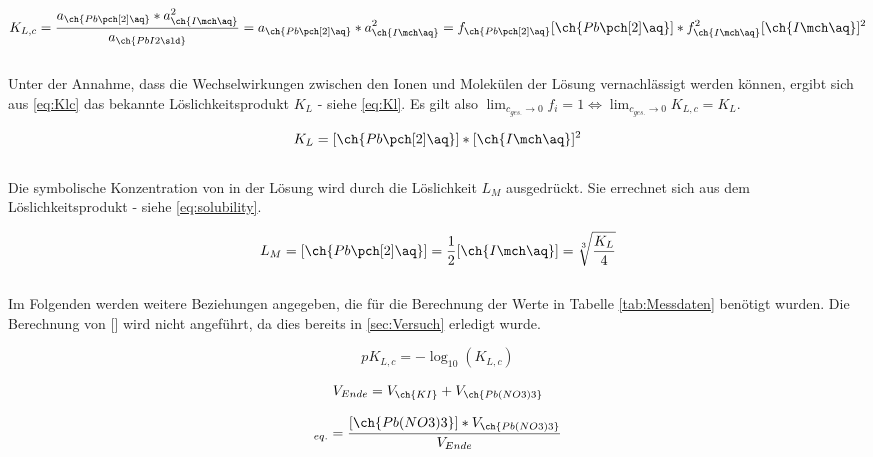 \documentclass{article}
\begin{document}
      \begin{equation}
        K_{L,c} = \frac{a_{\ch{Pb\pch[2]\aq}} * a_{\ch{I\mch\aq}}^2}{a_{\ch{PbI2\sld}}} = a_{\ch{Pb\pch[2]\aq}} * a_{\ch{I\mch\aq}}^2 = f_{\ch{Pb\pch[2]\aq}} [\ch{Pb\pch[2]\aq}] * f_{\ch{I\mch\aq}}^2 [\ch{I\mch\aq}]^2 \label{eq:Klc}
      \end{equation} \\
      
      Unter der Annahme, dass die Wechselwirkungen zwischen den Ionen und Molekülen der Lösung vernachlässigt werden können, ergibt sich aus \eqref{eq:Klc} das bekannte Löslichkeitsprodukt $K_{L}$ - siehe \eqref{eq:Kl}. Es gilt also $\lim_{c_{ges.}\to 0} f_{i} = 1 \Leftrightarrow \lim_{c_{ges.}\to 0} K_{L,c} = K_{L}$.
      
      \begin{equation}
        K_{L} = [\ch{Pb\pch[2]\aq}] * [\ch{I\mch\aq}]^2 \label{eq:Kl}
      \end{equation} \\
      
      Die symbolische Konzentration von  in der Lösung wird durch die Löslichkeit $L_{M}$ ausgedrückt. Sie errechnet sich aus dem Löslichkeitsprodukt - siehe \eqref{eq:solubility}.
      
      \begin{equation}
        L_{M} = [\ch{Pb\pch[2]\aq}] = \frac{1}{2} [\ch{I\mch\aq}] = \sqrt[3]{\frac{K_{L}}{4}} \label{eq:solubility}
      \end{equation} \\
      
      Im Folgenden werden weitere Beziehungen angegeben, die für die Berechnung der Werte in Tabelle \ref{tab:Messdaten} benötigt wurden. Die Berechnung von [] wird nicht angeführt, da dies bereits in \ref{sec:Versuch} erledigt wurde.
      
      \begin{equation}
        pK_{L,c} = -\log_{10} (K_{L,c})
      \end{equation}
      
      \begin{equation}
        V_{Ende} = V_{\ch{KI}} + V_{\ch{Pb(NO3)3}}
      \end{equation}
      
      \begin{equation}
        [\ch{Pb\pch[2]\aq}]_{eq.} = \frac{[\ch{Pb(NO3)3}] * V_{\ch{Pb(NO3)3}}}{V_{Ende}}
      \end{equation}
      
\end{document}
